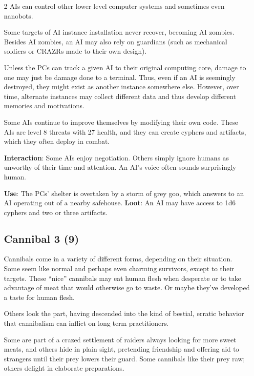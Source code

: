 \begin{multicols}{2}
AIs can control other lower level computer systems and sometimes even nanobots. 

Some targets of AI instance installation never recover, becoming AI zombies. Besides AI zombies, an AI may also rely on guardians (such as mechanical soldiers or CRAZRs made to their own design). 

Unless the PCs can track a given AI to their original computing core, damage to one may just be damage done to a terminal. Thus, even if an AI is seemingly destroyed, they might exist as another instance somewhere else. However, over time, alternate instances may collect different data and thus develop different memories and motivations. 

Some AIs continue to improve themselves by modifying their own code. These AIs are level 8 threats with 27 health, and they can create cyphers and artifacts, which they often deploy in combat. 

\textbf{Interaction}: Some AIs enjoy negotiation. Others simply ignore humans as unworthy of their time and attention. An AI’s voice often sounds surprisingly human. 

\textbf{Use}: The PCs’ shelter is overtaken by a storm of grey goo, which answers to an AI operating out of a nearby safehouse. 
\textbf{Loot}: An AI may have access to 1d6 cyphers and two or three artifacts.

\subsection{Cannibal 3 (9)}

Cannibals come in a variety of different forms, depending on their situation. Some seem like normal and perhaps even charming survivors, except to their targets. These “nice” cannibals may eat human flesh when desperate or to take advantage of meat that would otherwise go to waste. Or maybe they’ve developed a taste for human flesh. 

Others look the part, having descended into the kind of bestial, erratic behavior that cannibalism can inflict on long term practitioners. 

Some are part of a crazed settlement of raiders always looking for more sweet meats, and others hide in plain sight, pretending friendship and offering aid to strangers until their prey lowers their guard. Some cannibals like their prey raw; others delight in elaborate preparations. 


\end{multicols}
